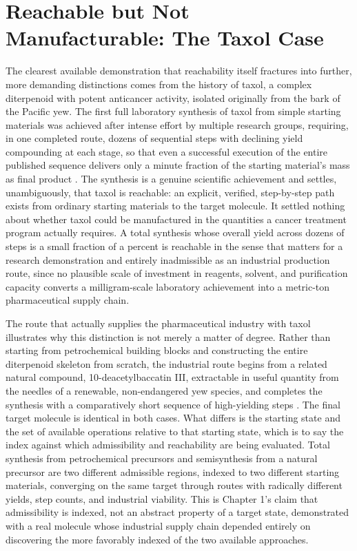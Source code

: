 \documentclass[11pt]{book}
\begin{document}
\section{Reachable but Not Manufacturable: The Taxol Case}

The clearest available demonstration that reachability itself fractures into further, more demanding distinctions comes from the history of taxol, a complex diterpenoid with potent anticancer activity, isolated originally from the bark of the Pacific yew. The first full laboratory synthesis of taxol from simple starting materials was achieved after intense effort by multiple research groups, requiring, in one completed route, dozens of sequential steps with declining yield compounding at each stage, so that even a successful execution of the entire published sequence delivers only a minute fraction of the starting material's mass as final product \cite{holton1994}. The synthesis is a genuine scientific achievement and settles, unambiguously, that taxol is reachable: an explicit, verified, step-by-step path exists from ordinary starting materials to the target molecule. It settled nothing about whether taxol could be manufactured in the quantities a cancer treatment program actually requires. A total synthesis whose overall yield across dozens of steps is a small fraction of a percent is reachable in the sense that matters for a research demonstration and entirely inadmissible as an industrial production route, since no plausible scale of investment in reagents, solvent, and purification capacity converts a milligram-scale laboratory achievement into a metric-ton pharmaceutical supply chain.

The route that actually supplies the pharmaceutical industry with taxol illustrates why this distinction is not merely a matter of degree. Rather than starting from petrochemical building blocks and constructing the entire diterpenoid skeleton from scratch, the industrial route begins from a related natural compound, 10-deacetylbaccatin III, extractable in useful quantity from the needles of a renewable, non-endangered yew species, and completes the synthesis with a comparatively short sequence of high-yielding steps \cite{denis1988}. The final target molecule is identical in both cases. What differs is the starting state and the set of available operations relative to that starting state, which is to say the index against which admissibility and reachability are being evaluated. Total synthesis from petrochemical precursors and semisynthesis from a natural precursor are two different admissible regions, indexed to two different starting materials, converging on the same target through routes with radically different yields, step counts, and industrial viability. This is Chapter 1's claim that admissibility is indexed, not an abstract property of a target state, demonstrated with a real molecule whose industrial supply chain depended entirely on discovering the more favorably indexed of the two available approaches.
\end{document}
